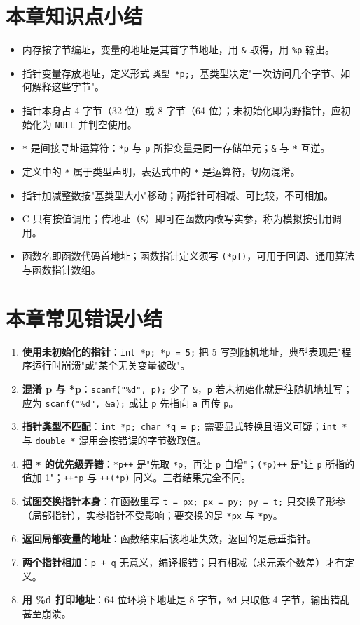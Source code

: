 \section{本章知识点小结}
\begin{itemize}
  \item 内存按字节编址，变量的地址是其首字节地址，用 \texttt{\&} 取得，用 \texttt{\%p} 输出。
  \item 指针变量存放地址，定义形式 \texttt{类型 *p;}，基类型决定"一次访问几个字节、如何解释这些字节"。
  \item 指针本身占 4 字节（32 位）或 8 字节（64 位）；未初始化即为野指针，应初始化为 \texttt{NULL} 并判空使用。
  \item \texttt{*} 是间接寻址运算符：\texttt{*p} 与 \texttt{p} 所指变量是同一存储单元；\texttt{\&} 与 \texttt{*} 互逆。
  \item 定义中的 \texttt{*} 属于类型声明，表达式中的 \texttt{*} 是运算符，切勿混淆。
  \item 指针加减整数按"基类型大小"移动；两指针可相减、可比较，不可相加。
  \item C 只有按值调用；传地址（\texttt{\&}）即可在函数内改写实参，称为模拟按引用调用。
  \item 函数名即函数代码首地址；函数指针定义须写 \texttt{(*pf)}，可用于回调、通用算法与函数指针数组。
\end{itemize}

\section{本章常见错误小结}
\begin{enumerate}
  \item \textbf{使用未初始化的指针}：\texttt{int *p; *p = 5;} 把 5 写到随机地址，典型表现是"程序运行时崩溃"或"某个无关变量被改"。
  \item \textbf{混淆 p 与 *p}：\texttt{scanf("\%d", p);} 少了 \texttt{\&}，\texttt{p} 若未初始化就是往随机地址写；应为 \texttt{scanf("\%d", \&a);} 或让 \texttt{p} 先指向 \texttt{a} 再传 \texttt{p}。
  \item \textbf{指针类型不匹配}：\texttt{int *p; char *q = p;} 需要显式转换且语义可疑；\texttt{int *} 与 \texttt{double *} 混用会按错误的字节数取值。
  \item \textbf{把 \texttt{*} 的优先级弄错}：\texttt{*p++} 是"先取 \texttt{*p}，再让 \texttt{p} 自增"；\texttt{(*p)++} 是"让 \texttt{p} 所指的值加 1"；\texttt{++*p} 与 \texttt{++(*p)} 同义。三者结果完全不同。
  \item \textbf{试图交换指针本身}：在函数里写 \texttt{t = px; px = py; py = t;} 只交换了形参（局部指针），实参指针不受影响；要交换的是 \texttt{*px} 与 \texttt{*py}。
  \item \textbf{返回局部变量的地址}：函数结束后该地址失效，返回的是悬垂指针。
  \item \textbf{两个指针相加}：\texttt{p + q} 无意义，编译报错；只有相减（求元素个数差）才有定义。
  \item \textbf{用 \%d 打印地址}：64 位环境下地址是 8 字节，\texttt{\%d} 只取低 4 字节，输出错乱甚至崩溃。
\end{enumerate}
